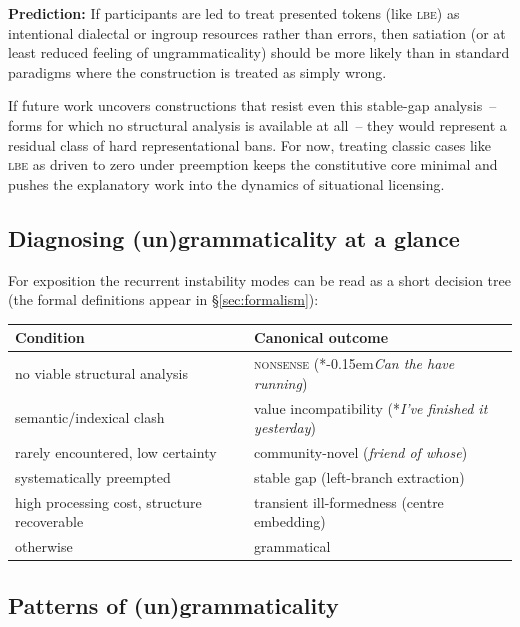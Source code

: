 \documentclass[12pt,letterpaper]{article}
\newcommand{\term}[1]{\textsc{#1}}
\newcommand{\mention}[1]{\textit{#1}}
\newcommand{\abbr}[1]{\textsc{#1}}
\newcommand{\judgesep}{\kern-0.15em}
\newcommand{\ungram}[1]{*\judgesep#1}
\begin{document}
\textbf{Prediction:} If participants are led to treat presented tokens (like \abbr{lbe}) as intentional dialectal or ingroup resources rather than errors, then satiation (or at least reduced feeling of ungrammaticality) should be more likely than in standard paradigms where the construction is treated as simply wrong.

If future work uncovers constructions that resist even this stable-gap analysis~-- forms for which no structural analysis is available at all~-- they would represent a residual class of hard representational bans. For now, treating classic cases like \abbr{lbe} as driven to zero under preemption keeps the constitutive core minimal and pushes the explanatory work into the dynamics of situational licensing.

\subsection{Diagnosing (un)grammaticality at a glance}
\label{sec:diag-tree}

For exposition the recurrent instability modes can be read as a short decision tree (the formal definitions appear in \S\ref{sec:formalism}):

\begin{center}
\begin{tabular}{@{}l@{\;$\longrightarrow$\;}l@{}}
\toprule
Condition & Canonical outcome\\
\midrule
no viable structural analysis &
\term{nonsense} (\ungram{\mention{Can the have running}})\\[4pt]
semantic/indexical clash &
value incompatibility (*\textit{I've finished it yesterday})\\[4pt]
rarely encountered, low certainty &
community-novel (\textit{friend of whose})\\[4pt]
systematically preempted &
stable gap (left-branch extraction)\\[4pt]
high processing cost, structure recoverable &
transient ill-formedness (centre embedding)\\[4pt]
otherwise &
grammatical\\
\bottomrule
\end{tabular}
\end{center}


\subsection{Patterns of (un)grammaticality}\label{sec:patterns}
\end{document}
